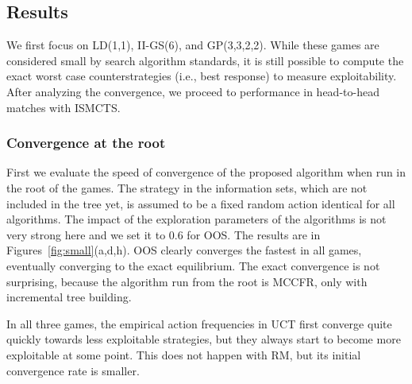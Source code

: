 \documentclass{aamas2015}
\begin{document}
\subsection{Results}

We first focus on LD(1,1), II-GS(6), and GP(3,3,2,2). While these games are considered small by search algorithm standards, it is still possible to compute the exact worst case counterstrategies (i.e., best response) to measure exploitability.  After analyzing the convergence, we proceed to performance in head-to-head matches with ISMCTS.

\subsubsection{Convergence at the root}

First we evaluate the speed of convergence of the proposed algorithm when run in the root of the games. The strategy in the information sets, which are not included in the tree yet, is assumed to be a fixed random action identical for all algorithms. The impact of the exploration parameters of the algorithms is not very strong here and we set it to $0.6$ for OOS. The results are in Figures~\ref{fig:small}(a,d,h). OOS clearly converges the fastest in all games, eventually converging to the exact equilibrium. The exact convergence is not surprising, because the algorithm run from the root is MCCFR, only with incremental tree building.

In all three games, the empirical action frequencies in UCT first converge quite quickly towards less exploitable strategies, but they always start to become more exploitable at some point. This does not happen with RM, but its initial convergence rate is smaller.
\end{document}
